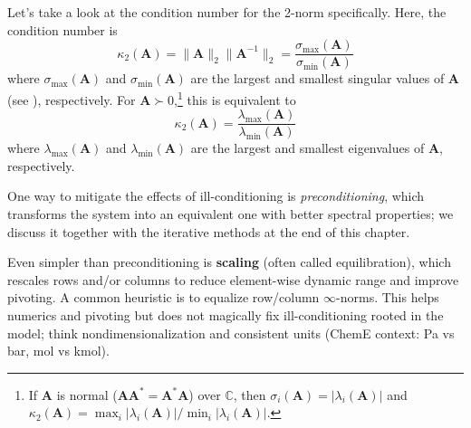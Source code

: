 Let's take a look at the condition number for the 2-norm specifically. Here, the condition number is
\begin{equation*}
    \kappa_2(\mathbf{A}) = \|\mathbf{A}\|_2 \|\mathbf{A}^{-1}\|_2 = \frac{\sigma_{\text{max}}(\mathbf{A})}{\sigma_{\text{min}}(\mathbf{A})}
\end{equation*}
where $\sigma_{\text{max}}(\mathbf{A})$ and $\sigma_{\text{min}}(\mathbf{A})$ are the largest and smallest singular values of $\mathbf{A}$ (see ), respectively. For $\mathbf{A} \succ 0$,\footnote{If $\mathbf{A}$ is normal ($\mathbf{A}\mathbf{A}^* = \mathbf{A}^*\mathbf{A}$) over $\mathbb{C}$, then $\sigma_i(\mathbf{A}) = |\lambda_i(\mathbf{A})|$ and $\kappa_2(\mathbf{A}) = \max_i |\lambda_i(\mathbf{A})|/\min_i |\lambda_i(\mathbf{A})|$.} this is equivalent to
\begin{equation*}
    \kappa_2(\mathbf{A}) = \frac{\lambda_{\text{max}}(\mathbf{A})}{\lambda_{\text{min}}(\mathbf{A})}
\end{equation*}
where $\lambda_{\text{max}}(\mathbf{A})$ and $\lambda_{\text{min}}(\mathbf{A})$ are the largest and smallest eigenvalues of $\mathbf{A}$, respectively.

One way to mitigate the effects of ill-conditioning is \emph{preconditioning}, which transforms the system into an equivalent one with better spectral properties; we discuss it together with the iterative methods at the end of this chapter.

Even simpler than preconditioning is \textbf{scaling} (often called equilibration), which rescales rows and/or columns to reduce element-wise dynamic range and improve pivoting. A common heuristic is to equalize row/column $\infty$-norms. This helps numerics and pivoting but does not magically fix ill-conditioning rooted in the model; think nondimensionalization and consistent units (ChemE context: Pa vs bar, mol vs kmol).


